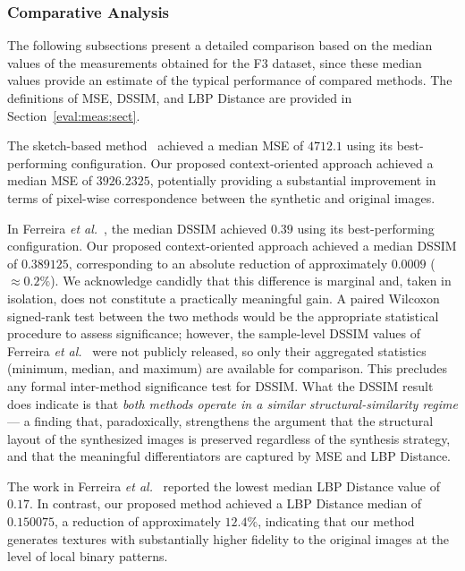 \documentclass{ieeeaccess}
\begin{document}
\subsubsection{Comparative Analysis}

The following subsections present a detailed comparison based on the median values of the measurements obtained for the F3 dataset, since these median values provide an estimate of the typical performance of compared methods. The  definitions of MSE, DSSIM, and LBP Distance are provided in Section~\ref{eval:meas:sect}.

The sketch-based method~\cite{Ferreira2020} achieved a median MSE of $4712.1$ using its best-performing configuration. Our proposed context-oriented approach achieved a median MSE of $3926.2325$, potentially providing  a substantial improvement in terms of pixel-wise correspondence between the synthetic and original images.

In Ferreira \emph{et al.}~\cite{Ferreira2020}, the median DSSIM achieved $0.39$ using its best-performing configuration. Our proposed context-oriented approach achieved a median DSSIM of $0.389125$, corresponding to an absolute reduction of approximately $0.0009$ ($\approx 0.2\%$). We acknowledge candidly that this difference is marginal and, taken in isolation, does not constitute a practically meaningful gain. A paired Wilcoxon signed-rank test between the two methods would be the appropriate statistical procedure to assess significance; however, the sample-level DSSIM values of Ferreira \emph{et al.}~\cite{Ferreira2020} were not publicly released, so only their aggregated statistics (minimum, median, and maximum) are available for comparison. This precludes any formal inter-method significance test for DSSIM. What the DSSIM result does indicate is that \emph{both methods operate in a similar structural-similarity regime} --- a finding that, paradoxically, strengthens the argument that the structural layout of the synthesized images is preserved regardless of the synthesis strategy, and that the meaningful differentiators are captured by MSE and LBP Distance.

The work in Ferreira \emph{et al.}~\cite{Ferreira2020} reported the lowest median LBP Distance value of $0.17$. In contrast, our proposed method achieved a LBP Distance median of $0.150075$, a reduction of approximately $12.4\%$, indicating that our method generates textures with substantially higher fidelity to the original images at the level of local binary patterns.
\end{document}
